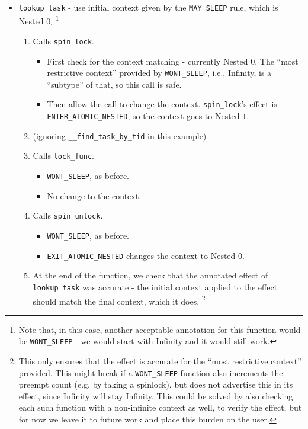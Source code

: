 \documentclass{article}
\begin{document}
\begin{itemize}
	\item \texttt{lookup\_task} - use initial context given by the \texttt{MAY\_SLEEP} rule, which is \textsf{Nested $0$}.
		\footnote{Note that, in this case, another acceptable annotation for this function would be \texttt{WONT\_SLEEP} - we would start with \textsf{Infinity} and it would still work.}
	\begin{enumerate}
		\item Calls \texttt{spin\_lock}.
			\begin{itemize}
				\item First check for the context matching - currently \textsf{Nested $0$}. The ``most restrictive context'' provided by \texttt{WONT\_SLEEP}, i.e., \textsf{Infinity}, is a ``subtype'' of that, so this call is safe.
				\item Then allow the call to change the context. \texttt{spin\_lock}'s effect is \texttt{ENTER\_ATOMIC\_NESTED}, so the context goes to \textsf{Nested $1$}.
			\end{itemize}
		\item (ignoring \texttt{\_\_find\_task\_by\_tid} in this example)
		\item Calls \texttt{lock\_func}.
			\begin{itemize}
				\item \texttt{WONT\_SLEEP}, as before.
				\item No change to the context.
			\end{itemize}
		\item Calls \texttt{spin\_unlock}.
			\begin{itemize}
				\item \texttt{WONT\_SLEEP}, as before.
				\item \texttt{EXIT\_ATOMIC\_NESTED} changes the context to \textsf{Nested $0$}.
			\end{itemize}
		\item At the end of the function, we check that the annotated effect of \texttt{lookup\_task} was accurate - the initial context applied to the effect should match the final context, which it does.
			\footnote{This only ensures that the effect is accurate for the ``most restrictive context'' provided. This might break if a \texttt{WONT\_SLEEP} function also increments the preempt count (e.g. by taking a spinlock), but does not advertise this in its effect, since \textsf{Infinity} will stay \textsf{Infinity}. This could be solved by also checking each such function with a non-infinite context as well, to verify the effect, but for now we leave it to future work and place this burden on the user.}

\end{enumerate}
\end{itemize}
\end{document}
